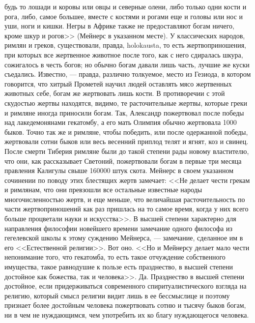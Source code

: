 \documentclass[12pt]{article}
\begin{document}
будь то лошади и коровы или овцы и северные олени, либо только одни кости и рога, либо, самое большее, вместе с костями и рогами еще и головы или нос и уши, ноги и кишки. Негры в Африке также не предоставляют богам ничего, кроме шкур и рогов>> (Мейнерс в указанном месте). У классических народов, римлян и греков, существовали, правда, holokausta, то есть жертвоприношения, при которых все жертвенное животное после того, как с него сдиралась шкура, сожигалось в честь богов; но обычно богам давали лишь часть, лучшие же куски съедались. Известно, --- правда, различно толкуемое, место из Гезиода, в котором говорится, что хитрый Прометей научил людей оставлять мясо жертвенных животных себе, богам же жертвовать лишь кости. В противоречии с этой скудостью жертвы находятся, видимо, те расточительные жертвы, которые греки и римляне иногда приносили богам. Так, Александр пожертвовал после победы над лакедемонянами гекатомбу, а его мать Олимпия обычно жертвовала 1000 быков. Точно так же и римляне, чтобы победить, или после одержанной победы, жертвовали сотни быков или весь весенний приплод телят и ягнят, коз и свинец. После смерти Тиберия римляне были до такой степени рады новому властителю, что они, как рассказывает Светоний, пожертвовали богам в первые три месяца правления Калигулы свыше 160000 штук скота. Мейнерс в своем указанном сочинении по поводу этих блестящих жертв замечает: <<Не делает чести грекам и римлянам, что они превзошли все остальные известные народы многочисленностью жертв, и еще меньше, что величайшая расточительность по части жертвоприношений как раз пришлась на то самое время, когда у них всего больше процветали науки и искусства>>. В высшей степени характерно для направления философии новейшего времени замечание одного философа из гегелевской школы к этому суждению Мейнерса, --- замечание, сделанное им в его <<Естественной религии>>. Вот оно. <<Но и Мейнерсу делает мало чести непонимание того, что гекатомба, то есть такое отчуждение собственного имущества, такое равнодушие к пользе есть празднество, в высшей степени достойное как божества, так и человека>>. Да. Празднество в высшей степени достойное, если придерживаться современного спиритуалистического взгляда на религию, который смысл религии видит лишь в ее бессмыслице и поэтому признает более достойным человека пожертвовать сотню и тысячу быков богам, ни в чем не нуждающимся, чем употребить их ко благу нуждающегося человека. 
\end{document}
